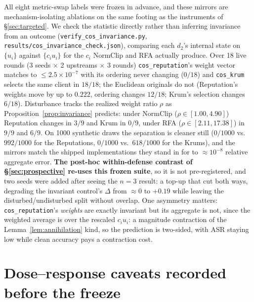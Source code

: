 \documentclass{article}
\begin{document}
All eight metric-swap labels were frozen in advance, and these mirrors are mechanism-isolating ablations on the same footing as the instruments of \S\ref{sec:targeted}. We check the statistic directly rather than inferring invariance from an outcome (\texttt{verify\_cos\_invariance.py}, \texttt{results/cos\_invariance\_check.json}), comparing each $d_2$'s internal state on $\{u_i\}$ against $\{c_i u_i\}$ for the $c_i$ NormClip and RFA actually produce. Over 18 live rounds (3 seeds $\times$ 2 upstreams $\times$ 3 rounds) \texttt{cos\_reputation}'s weight vector matches to $\le 2.5\times10^{-7}$ with its ordering never changing ($0/18$) and \texttt{cos\_krum} selects the same client in $18/18$; the Euclidean originals do not (Reputation's weights move by up to $0.222$, ordering changes $12/18$; Krum's selection changes $6/18$). Disturbance tracks the realized weight ratio $\rho$ as Proposition~\ref{prop:invariance} predicts: under NormClip ($\rho \in [1.00, 4.90]$) Reputation changes in $3/9$ and Krum in $0/9$, under RFA ($\rho \in [2.11, 17.38]$) in $9/9$ and $6/9$. On 1000 synthetic draws the separation is cleaner still ($0/1000$ vs.\ $992/1000$ for the Reputations, $0/1000$ vs.\ $618/1000$ for the Krums), and the mirrors match the shipped implementations they stand in for to ${\approx}10^{-8}$ relative aggregate error. \textbf{The post-hoc within-defense contrast of \S\ref{sec:prospective} re-uses this frozen suite}, so it is not pre-registered, and two seeds were added after seeing the $n{=}3$ result: a top-up that cut both ways, degrading the invariant control's $\Delta$ from ${\approx}0$ to $+0.19$ while leaving the disturbed/undisturbed split without overlap. One asymmetry matters: \texttt{cos\_reputation}'s \emph{weights} are exactly invariant but its aggregate is not, since the weighted average is over the rescaled $c_i u_i$: a magnitude contraction of the Lemma~\ref{lem:annihilation} kind, so the prediction is two-sided, with ASR staying low while clean accuracy pays a contraction cost.

\section{Dose--response caveats recorded before the freeze}
\label{app:dose_caveats}
\end{document}
